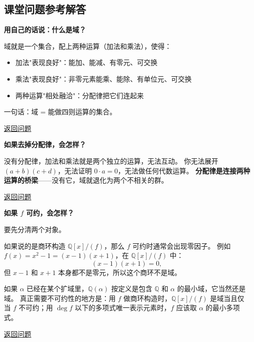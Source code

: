 \subsection*{课堂问题参考解答}

\begin{exercise}\label{ex:ans-field-what-is-field}
\hypertarget{ans:field-what-is-field}{}
\textbf{用自己的话说：什么是域？}

域就是一个集合，配上两种运算（加法和乘法），使得：
\begin{itemize}
    \item 加法"表现良好"：能加、能减、有零元、可交换
    \item 乘法"表现良好"：非零元素能乘、能除、有单位元、可交换
    \item 两种运算"相处融洽"：分配律把它们连起来
\end{itemize}
一句话：域 = 能做四则运算的集合。

\hyperlink{q:field-what-is-field}{返回问题}
\end{exercise}

\begin{exercise}\label{ex:ans-no-distributive-law}
\hypertarget{ans:no-distributive-law}{}
\textbf{如果去掉分配律，会怎样？}

没有分配律，加法和乘法就是两个独立的运算，无法互动。
你无法展开 $(a+b)(c+d)$，无法证明 $0 \cdot a = 0$，无法做任何代数运算。
\textbf{分配律是连接两种运算的桥梁}——没有它，域就退化为两个不相关的群。

\hyperlink{q:no-distributive-law}{返回问题}
\end{exercise}

\begin{exercise}\label{ex:ans-reducible-polynomial}
\hypertarget{ans:reducible-polynomial}{}
\textbf{如果 $f$ 可约，会怎样？}

要先分清两个对象。

如果说的是商环构造 $\mathbb{Q}[x]/(f)$，那么 $f$ 可约时通常会出现零因子。
例如 $f(x)=x^2-1=(x-1)(x+1)$，在 $\mathbb{Q}[x]/(f)$ 中：
\[(x-1)(x+1)=0,\]
但 $x-1$ 和 $x+1$ 本身都不是零元，所以这个商环不是域。

如果 $\alpha$ 已经在某个扩域里，$\mathbb{Q}(\alpha)$ 按定义是包含 $\mathbb{Q}$ 和 $\alpha$ 的最小域，它当然还是域。
真正需要不可约性的地方是：用 $f$ 做商环构造时，$\mathbb{Q}[x]/(f)$ 是域当且仅当 $f$ 不可约；用 $\deg f$ 以下的多项式唯一表示元素时，$f$ 应该取 $\alpha$ 的最小多项式。

\hyperlink{q:reducible-polynomial}{返回问题}
\end{exercise}

